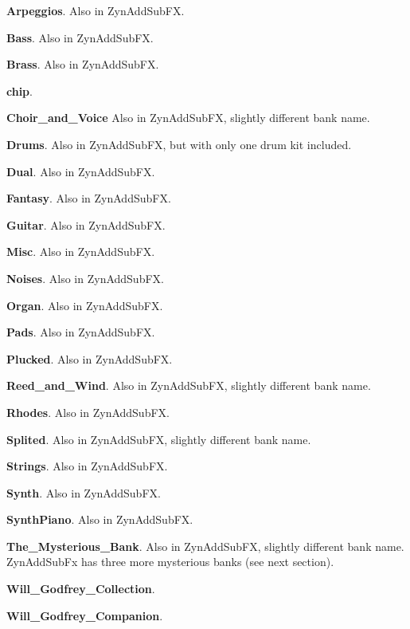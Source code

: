    \begin{enumber}
      \item \textbf{Arpeggios}.
         Also in ZynAddSubFX.
      \item \textbf{Bass}.
         Also in ZynAddSubFX.
      \item \textbf{Brass}.
         Also in ZynAddSubFX.
      \item \textbf{chip}.
      \item \textbf{Choir\_and\_Voice}
         Also in ZynAddSubFX, slightly different bank name.
      \item \textbf{Drums}.
         Also in ZynAddSubFX, but with only one drum kit included.
      \item \textbf{Dual}.
         Also in ZynAddSubFX.
      \item \textbf{Fantasy}.
         Also in ZynAddSubFX.
      \item \textbf{Guitar}.
         Also in ZynAddSubFX.
      \item \textbf{Misc}.
         Also in ZynAddSubFX.
      \item \textbf{Noises}.
         Also in ZynAddSubFX.
      \item \textbf{Organ}.
         Also in ZynAddSubFX.
      \item \textbf{Pads}.
         Also in ZynAddSubFX.
      \item \textbf{Plucked}.
         Also in ZynAddSubFX.
      \item \textbf{Reed\_and\_Wind}.
         Also in ZynAddSubFX, slightly different bank name.
      \item \textbf{Rhodes}.
         Also in ZynAddSubFX.
      \item \textbf{Splited}.
         Also in ZynAddSubFX, slightly different bank name.
      \item \textbf{Strings}.
         Also in ZynAddSubFX.
      \item \textbf{Synth}.
         Also in ZynAddSubFX.
      \item \textbf{SynthPiano}.
         Also in ZynAddSubFX.
      \item \textbf{The\_Mysterious\_Bank}.
         Also in ZynAddSubFX, slightly different bank name.
         ZynAddSubFx has three more mysterious banks (see next section).
      \item \textbf{Will\_Godfrey\_Collection}.
      \item \textbf{Will\_Godfrey\_Companion}.
   \end{enumber}

